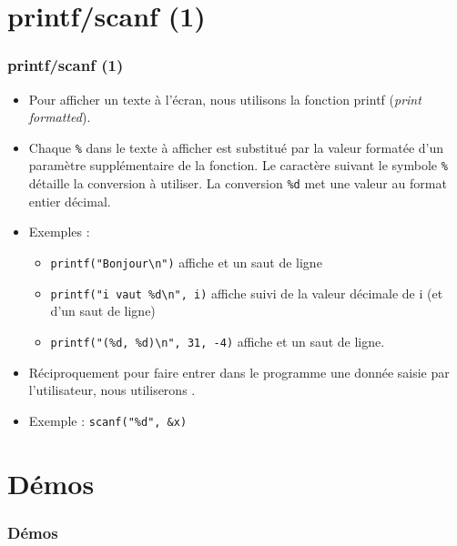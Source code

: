 \documentclass[xcolor=svgnames]{beamer}
\begin{document}
\section{printf/scanf (1)}
\begin{frame}[fragile]
  \frametitle{printf/scanf (1) \nowrite}
\begin{itemize}
\item  Pour afficher un texte à l'écran, nous utilisons la fonction \alert{printf}
  (\emph{print formatted}). 
\item Chaque \verb+%+ 
dans le texte à afficher est substitué par la valeur formatée d'un
\alert{paramètre supplémentaire} de la fonction. Le caractère suivant le
symbole \verb+%+ 
détaille la conversion à utiliser.  La conversion  \verb+%d+
met une valeur au format \alert{entier décimal}.
\pause
\item Exemples :
  \begin{itemize}
\item
    \verb+printf("Bonjour\n")+ 
affiche  et un saut de
    ligne\pause
\item
    \verb+printf("i vaut %d\n", i)+ 
affiche  suivi de la valeur décimale de i (et d'un saut de
ligne)\pause
\item
    \verb+printf("(%d, %d)\n", 31, -4)+ 
affiche  et un saut de ligne.
 \end{itemize}
\pause
\item Réciproquement pour faire entrer dans le programme une donnée saisie par
  l'utilisateur, nous utiliserons \alert{}.
\item Exemple : \verb+scanf("%d", &x)+
\end{itemize}
\end{frame}

\section*{Démos}
\begin{frame}
  \frametitle{Démos}
\end{frame}
\end{document}
